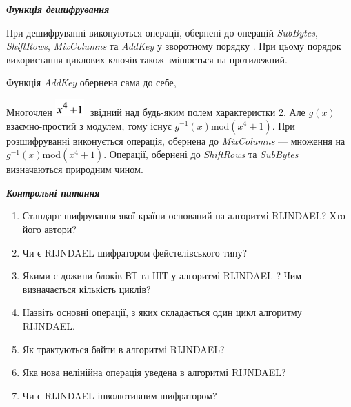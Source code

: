 \bigskip


\bigskip

{\centering\bfseries\itshape
Функція дешифрування
\par}


\bigskip


\bigskip

При дешифруванні виконуються операції, обернені до операцій \textit{SubBytes},
\textit{ShiftRows}, \textit{MixColumns}\textit{ }та \textit{AddKey} у
зворотному порядку . При цьому порядок використання циклових ключів також
змінюється на протилежний.

Функція \textit{AddKey} обернена сама до себе,

Многочлен 
\includegraphics[width=0.4307in,height=0.25in]{crypt-img/crypt-img336.png}  $ $
звідний над будь-яким полем характеристки 2. Але  ${g(x)}$ взаємно-простий з
модулем, тому існує  ${g^{{-1}}(x)\text{mod}(x^{{4}}+1)}$. При розшифруванні
виконується операція, обернена до \textit{MixColumns} --- множення на 
${g^{{-1}}(x)\text{mod}(x^{{4}}+1)}$. Операції, обернені до  \textit{ShiftRows
}та \textit{SubBytes }визначаються природним чином.


\bigskip


\bigskip

{\centering\bfseries\itshape
Контрольні питання
\par}


\bigskip


\bigskip

\liststyleWWviiiNumlviii
\begin{enumerate}
\item Стандарт шифрування якої країни оснований на алгоритмі RIJNDAEL? Хто його
автори?
\item Чи є  RIJNDAEL шифратором фейстелівського типу?
\item Якими є дожини блоків ВТ та ШТ у алгоритмі RIJNDAEL ? Чим визначається
кількість циклів?
\item Назвіть основні операції, з яких складається один цикл алгоритму RIJNDAEL.
\item Як трактуються байти в алгоритмі RIJNDAEL?
\item Яка нова нелінійна операція уведена в алгоритмі RIJNDAEL?
\item Чи є RIJNDAEL інволютивним шифратором?
\end{enumerate}

